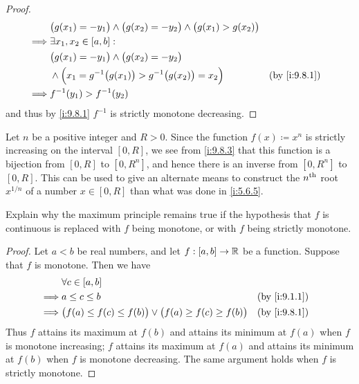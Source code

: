 \begin{proof}
\begin{align*}
             & \big(g(x_1) = -y_1\big) \land \big(g(x_2) = -y_2\big) \land \big(g(x_1) > g(x_2)\big)                     \\
    \implies & \exists x_1, x_2 \in [a, b] :                                                                             \\
             & \big(g(x_1) = -y_1\big) \land \big(g(x_2) = -y_2\big)                                                     \\
             & \land \Big(x_1 = g^{-1}\big(g(x_1)\big) > g^{-1}\big(g(x_2)\big) = x_2\Big)             &  & \by{i:9.8.1} \\
    \implies & f^{-1}(y_1) > f^{-1}(y_2)
  \end{align*}
  and thus by \cref{i:9.8.1} \(f^{-1}\) is strictly monotone decreasing.
\end{proof}

\begin{eg}\label{i:9.8.4}
  Let \(n\) be a positive integer and \(R > 0\).
  Since the function \(f(x) \coloneqq x^n\) is strictly increasing on the interval \([0, R]\), we see from \cref{i:9.8.3} that this function is a bijection from \([0, R]\) to \([0, R^n]\), and hence there is an inverse from \([0, R^n]\) to \([0, R]\).
  This can be used to give an alternate means to construct the \(n^{\operatorname{th}}\) root \(x^{1 / n}\) of a number \(x \in [0, R]\) than what was done in \cref{i:5.6.5}.
\end{eg}

\exercisesection

\begin{ex}\label{i:ex:9.8.1}
  Explain why the maximum principle remains true if the hypothesis that \(f\) is continuous is replaced with \(f\) being monotone, or with \(f\) being strictly monotone.
\end{ex}

\begin{proof}
  Let \(a < b\) be real numbers, and let \(f : [a, b] \to \mathbb{R}\) be a function.
  Suppose that \(f\) is monotone.
  Then we have
  \begin{align*}
             & \forall c \in [a, b]                                                                         \\
    \implies & a \leq c \leq b                                                            &  & \by{i:9.1.1} \\
    \implies & \big(f(a) \leq f(c) \leq f(b)\big) \lor \big(f(a) \geq f(c) \geq f(b)\big) &  & \by{i:9.8.1} \\
  \end{align*}
  Thus \(f\) attains its maximum at \(f(b)\) and attains its minimum at \(f(a)\) when \(f\) is monotone increasing;
  \(f\) attains its maximum at \(f(a)\) and attains its minimum at \(f(b)\) when \(f\) is monotone decreasing.
  The same argument holds when \(f\) is strictly monotone.
\end{proof}

